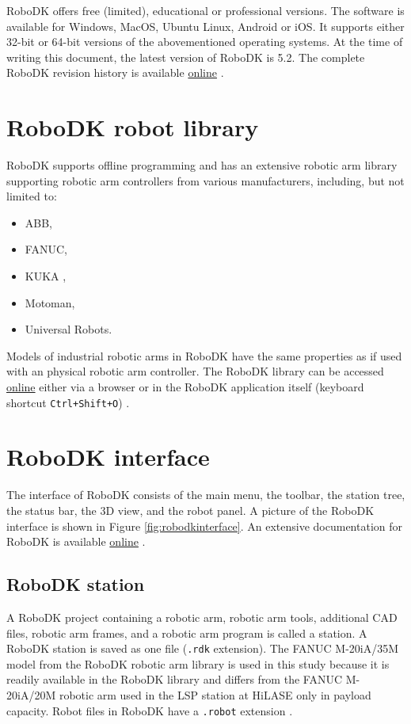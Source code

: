 RoboDK offers free (limited), educational or professional versions. 
The software is available for Windows, MacOS, Ubuntu Linux, Android or iOS. It supports either 32-bit or 64-bit versions of the abovementioned operating systems. At the time of writing this document, the latest version of RoboDK is 5.2. The complete RoboDK revision history is available \href{https://robodk.com/whatsnew}{online} \cite{robodkversions}. 

\section{RoboDK robot library}

RoboDK supports offline programming and has an extensive robotic arm library supporting robotic arm controllers from various manufacturers, including, but not limited to:

\begin{itemize}
    \item ABB, 
    \item FANUC, 
    \item KUKA ,
    \item Motoman, 
    \item Universal Robots.
\end{itemize}
Models of industrial robotic arms in RoboDK have the same properties as if used with an physical robotic arm controller. The RoboDK library can be accessed \href{https://robodk.com/library}{online} either via a browser or in the RoboDK application itself (keyboard shortcut \texttt{Ctrl+Shift+O}) \cite{robodklibrary}.


\section{RoboDK interface}

The interface of RoboDK consists of the main menu, the toolbar, the station tree, the status bar, the 3D view, and the robot panel. A picture of the RoboDK interface is shown in Figure \ref{fig:robodkinterface}. An extensive documentation for RoboDK is available \href{https://robodk.com/doc/en/Basic-Guide.html#Start}{online} \cite{robodkinterface}.

\subsection{RoboDK station}

A RoboDK project containing a robotic arm, robotic arm tools, additional CAD files, robotic arm frames, and a robotic arm program is called a station. A RoboDK station is saved as one file (\texttt{.rdk} extension).  The FANUC M-20iA/35M model from the RoboDK robotic arm library is used in this study because it is readily available in the RoboDK library and differs from the FANUC M-20iA/20M robotic arm used in the LSP station at HiLASE only in payload capacity. Robot files in RoboDK have a \texttt{.robot} extension \cite{robodkstation}.

